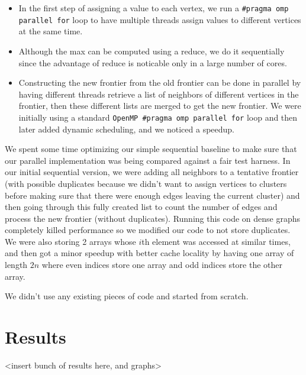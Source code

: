 \documentclass[11pt]{scrartcl}
\theoremstyle{plain}
\theoremstyle{definition}
\theoremstyle{remark}
\begin{document}
\begin{itemize}
\item In the first step of assigning a value to each vertex,
we run a \texttt{\#pragma omp parallel for} loop to
have multiple threads assign values to different vertices
at the same time.

\item Although the max can be computed using a reduce, we do
it sequentially since the advantage of reduce is noticable
only in a large number of cores.

\item Constructing the new frontier from the old frontier
can be done in parallel by having different threads
retrieve a list of neighbors of different vertices
in the frontier, then these different lists are merged
to get the new frontier. We were initially using
a standard \texttt{OpenMP \#pragma omp parallel for}
loop and then later added dynamic scheduling, and we noticed
a speedup.

\end{itemize}

We spent some time optimizing our simple sequential
baseline to make sure that our parallel implementation
was being compared against a fair test harness.
In our initial sequential version, we were adding
all neighbors to a tentative frontier (with possible
duplicates because we didn't want to assign vertices
to clusters before making sure that there were enough
edges leaving the current cluster) and then going
through this fully created list to count the number
of edges and process the new frontier (without
duplicates). Running this code on dense graphs
completely killed performance so we modified our
code to not store duplicates. We were also
storing 2 arrays whose $i$th element was accessed
at similar times, and then got a minor speedup
with better cache locality by having one array
of length $2n$ where even indices store one array
and odd indices store the other array.

We didn't use any existing pieces of code and started from
scratch.

\section{Results}

<insert bunch of results here, and graphs>
\end{document}
